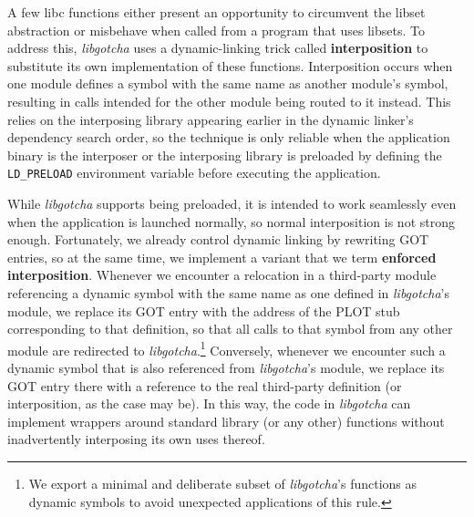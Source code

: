 A few libc functions either present an opportunity to circumvent the libset
abstraction or misbehave when called from a program that uses libsets.  To address
this, \textit{libgotcha} uses a dynamic-linking trick called \textbf{interposition}
to substitute its own implementation of these functions.  Interposition occurs when
one module defines a symbol with the same name as another module's symbol, resulting
in calls intended for the other module being routed to it instead.  This relies on
the interposing library appearing earlier in the dynamic linker's dependency search
order, so the technique is only reliable when the application binary is the
interposer or the interposing library is preloaded by defining the
\texttt{LD\_PRELOAD} environment variable before executing the application.

While \textit{libgotcha} supports being preloaded, it is intended to work seamlessly
even when the application is launched normally, so normal interposition is not strong
enough.  Fortunately, we already control dynamic linking by rewriting GOT entries, so
at the same time, we implement a variant that we term \textbf{enforced
interposition}.  Whenever we encounter a relocation in a third-party module
referencing a dynamic symbol with the same name as one defined in
\textit{libgotcha}'s module, we replace its GOT entry with the address of the PLOT
stub corresponding to that definition, so that all calls to that symbol from any
other module are redirected to \textit{libgotcha}.\footnote{We export a minimal and
deliberate subset of \textit{libgotcha}'s functions as dynamic symbols to avoid
unexpected applications of this rule.}  Conversely, whenever we encounter such a
dynamic symbol that is also referenced from \textit{libgotcha}'s module, we replace
its GOT entry there with a reference to the real third-party definition (or
interposition, as the case may be).  In this way, the code in \textit{libgotcha} can
implement wrappers around standard library (or any other) functions without
inadvertently interposing its own uses thereof.

